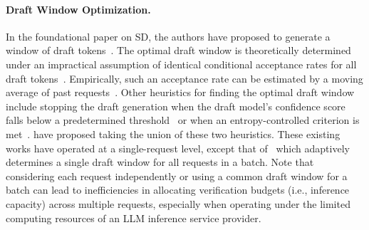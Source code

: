 \paragraph{Draft Window Optimization.}
In the foundational paper on SD, the authors have proposed to generate a window of draft tokens~\citep{leviathan2023}. 
The optimal draft window is theoretically determined under an impractical assumption of identical conditional acceptance rates for all draft tokens~\citep{leviathan2023}.
Empirically, such an acceptance rate can be estimated by a moving average of past requests~\citep{liu2024optimizingspeculativedecodingserving}.
Other heuristics for finding the optimal draft window include stopping the draft generation when the draft model's confidence score falls below a predetermined threshold~\citep{kim2023speculativedecodingbiglittle,liu2024kangaroo} or when an entropy-controlled criterion is met~\citep{agrawal2024adaedlearlydraftstopping}.
\citet{cai2024medusa} have proposed taking the union of these two heuristics.
These existing works have operated at a single-request level, except that of~\citet{liu2024optimizingspeculativedecodingserving}  which adaptively determines a single draft window for all requests in a batch.
Note that considering each request independently or using a common draft window for a batch can lead to inefficiencies in allocating verification budgets (i.e., inference capacity) across multiple requests, especially when operating under the limited computing resources of an LLM inference service provider.